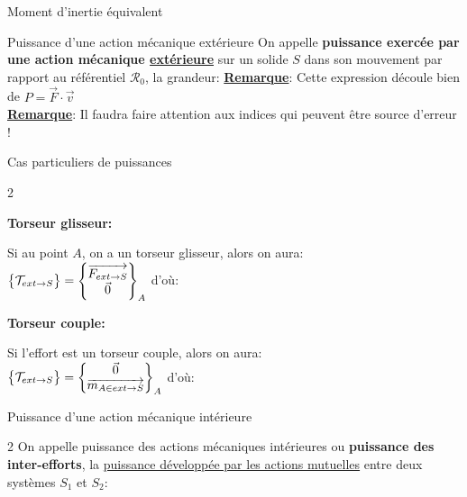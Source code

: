\documentclass{article} %
\begin{document}
{\begin{definition}{Moment d'inertie équivalent}
\end{definition}
\begin{definition}{Puissance d'une action mécanique extérieure}
On appelle \textbf{puissance exercée par une action mécanique \underline{extérieure}} sur un solide $S$ dans son mouvement par rapport au référentiel $\mathcal{R}_0$, la grandeur:
\underline{\textbf{Remarque}}: Cette expression découle bien de $P=\overrightarrow{F}\cdot\overrightarrow{v}$\\
\underline{\textbf{Remarque}}: Il faudra faire attention aux indices qui peuvent être source d'erreur !
\end{definition}
\begin{propriété}{Cas particuliers de puissances}
\begin{multicols}{2}
\begin{center}
\textbf{Torseur glisseur:}
\end{center}
Si au point $A$, on a un torseur glisseur, alors on aura:\\
$\begin{Bmatrix}\mathcal{T}_{ext\to S}\end{Bmatrix}=\begin{Bmatrix}\overrightarrow{F_{ext\to S}}\\ \vec{0}\end{Bmatrix}_A$ d'où:
\begin{center}
\textbf{Torseur couple:}
\end{center}
Si l'effort est un torseur couple, alors on aura:\\
$\begin{Bmatrix}\mathcal{T}_{ext\to S}\end{Bmatrix}=\begin{Bmatrix}\vec{0}\\ \overrightarrow{m_{A\in ext\to S}}\end{Bmatrix}_A$ d'où:
\end{multicols}
\end{propriété}
\begin{definition}{Puissance d'une action mécanique intérieure}\vspace*{-10pt}
\begin{multicols}{2}
On appelle puissance des actions mécaniques intérieures ou \textbf{puissance des inter-efforts}, la \underline{puissance développée par les actions mutuelles} entre deux systèmes $S_1$ et $S_2$:
\columnbreak
\begin{center}

\end{center}
\end{multicols}
\end{definition}}
\end{document}
